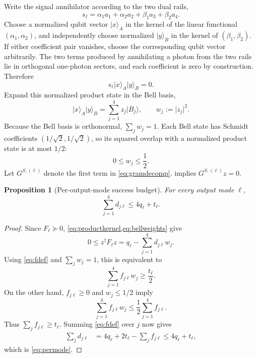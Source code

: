 \documentclass[11pt]{article}
\newtheorem{proposition}[theorem]{Proposition}
\theoremstyle{remark}
\newcommand{\ket}[1]{\lvert #1\rangle}
\newcommand{\abs}[1]{\lvert #1\rvert}
\begin{document}
Write the signal annihilator according to the two dual rails,
\begin{equation}
  s_\ell
  =\alpha_1a_1+\alpha_2a_2+\beta_1a_3+\beta_2a_4.
\end{equation}
Choose a normalized qubit vector \(\ket x_A\) in the kernel of the linear
functional \((\alpha_1,\alpha_2)\), and independently choose normalized
\(\ket y_B\) in the kernel of \((\beta_1,\beta_2)\). If either coefficient
pair vanishes, choose the corresponding qubit vector arbitrarily. The two
terms produced by annihilating a photon from the two rails lie in orthogonal
one-photon sectors, and each coefficient is zero by construction. Therefore
\begin{equation}
  s_\ell\ket x_A\ket y_B=0.
  \label{eq:productkernel}
\end{equation}
Expand this normalized product state in the Bell basis,
\begin{equation}
  \ket x_A\ket y_B=\sum_{j=1}^4 z_j\ket{B_j},
  \qquad
  w_j:=\abs{z_j}^2.
  \label{eq:bellweights}
\end{equation}
Because the Bell basis is orthonormal, \(\sum_jw_j=1\). Each Bell state has
Schmidt coefficients \((1/\sqrt2,1/\sqrt2)\), so its squared overlap with a
normalized product state is at most \(1/2\):
\begin{equation}
  0\le w_j\le\frac12.
  \label{eq:weightcap}
\end{equation}
Let \(G^{S,(\ell)}\) denote the first term in \cref{eq:gramdecomp}.
 implies \(G^{S,(\ell)}z=0\).

\begin{proposition}[Per-output-mode success budget]
\label{prop:permode}
For every output mode \(\ell\),
\begin{equation}
  \boxed{\sum_{j=1}^4d_{j\ell}\le4q_\ell+t_\ell.}
  \label{eq:permode}
\end{equation}
\end{proposition}

\begin{proof}
Since \(F_\ell\succeq0\), \cref{eq:productkernel,eq:bellweights} give
\begin{equation}
  0\le z^\dagger F_\ell z
   =q_\ell-\sum_{j=1}^4d_{j\ell}w_j.
  \label{eq:psdquad}
\end{equation}
Using \cref{eq:fdef} and \(\sum_jw_j=1\), this is equivalent to
\begin{equation}
  \sum_{j=1}^4f_{j\ell}w_j\ge\frac{t_\ell}{2}.
  \label{eq:weightedlower}
\end{equation}
On the other hand, \(f_{j\ell}\ge0\) and \(w_j\le1/2\) imply
\begin{equation}
  \sum_{j=1}^4f_{j\ell}w_j
   \le\frac12\sum_{j=1}^4f_{j\ell}.
\end{equation}
Thus \(\sum_jf_{j\ell}\ge t_\ell\). Summing \cref{eq:fdef} over \(j\) now
gives
\begin{align}
  \sum_jd_{j\ell}
   &=4q_\ell+2t_\ell-\sum_jf_{j\ell}
    \le4q_\ell+t_\ell,
\end{align}
which is \cref{eq:permode}.
\end{proof}
\end{document}
